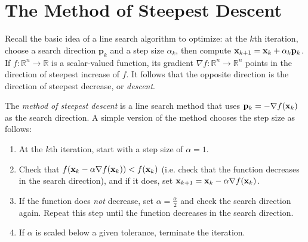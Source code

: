 

\section*{The Method of Steepest Descent} %

Recall the basic idea of a line search algorithm to optimize: at the $k$th iteration, choose a search direction $\mathbf{p}_k$ and a step size $\alpha_k$, then compute $\mathbf{x}_{k+1} = \mathbf{x}_{k} + \alpha_k\mathbf{p}_k$.
If $f:\mathbb{R}^n\rightarrow\mathbb{R}$ is a scalar-valued function, its gradient $\nabla f:\mathbb{R}^n\rightarrow\mathbb{R}^n$ points in the direction of steepest increase of $f$.
It follows that the opposite direction is the direction of steepest decrease, or \emph{descent}.

The \emph{method of steepest descent} is a line search method that uses $\mathbf{p}_k = -\nabla f(\mathbf{x}_k)$ as the search direction.
A simple version of the method chooses the step size as follows:
\begin{enumerate}
    \item At the $k$th iteration, start with a step size of $\alpha = 1$.
    \item Check that $f(\mathbf{x}_k - \alpha\nabla f(\mathbf{x}_k)) < f(\mathbf{x}_k)$ (i.e. check that the function decreases in the search direction), and if it does, set $\mathbf{x}_{k+1} = \mathbf{x}_k - \alpha\nabla f(\mathbf{x}_k)$.
    \item If the function does \emph{not} decrease, set $\alpha = \frac{\alpha}{2}$ and check the search direction again.
    Repeat this step until the function decreases in the search direction.
    \item If $\alpha$ is scaled below a given tolerance, terminate the iteration.
\end{enumerate}

